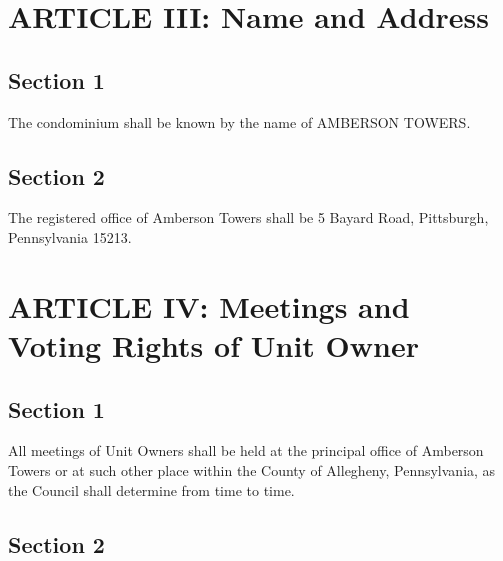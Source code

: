 \documentclass[
]{book}
\begin{document}
\hypertarget{article-iii-name-and-address}{%
\section*{ARTICLE III: Name and Address}\label{article-iii-name-and-address}}

\hypertarget{section-1-2}{%
\subsection*{Section 1}\label{section-1-2}}

The condominium shall be known by the name of AMBERSON TOWERS.

\hypertarget{section-2-2}{%
\subsection*{Section 2}\label{section-2-2}}

The registered office of Amberson Towers shall be 5 Bayard Road, Pittsburgh, Pennsylvania 15213.

\hypertarget{article-iv-meetings-and-voting-rights-of-unit-owner}{%
\section*{ARTICLE IV: Meetings and Voting Rights of Unit Owner}\label{article-iv-meetings-and-voting-rights-of-unit-owner}}

\hypertarget{section-1-3}{%
\subsection*{Section 1}\label{section-1-3}}

All meetings of Unit Owners shall be held at the principal office of Amberson Towers or at such other place within the County of Allegheny, Pennsylvania, as the Council shall determine from time to time.

\hypertarget{section-2-3}{%
\subsection*{Section 2}\label{section-2-3}}
\end{document}
